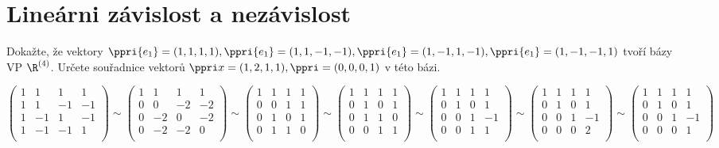 
\let\braceru=\relax \let\bracelu=\relax 
\def\o#1{\setbox0=
	\hbox{$\kern2pt\overbrace{\kern-2pt#1\kern-2pt}\kern2pt$}\ht0=2.1ex\box0}
\def\to#1{\hbox{#1\rlap{\t{}}}}
\def\rad{\rm{rad}}
\def\f{\frac}
\BeginDoc{}
\section{Lineárni závislost a nezávislost}

\Pr Dokažte, že vektory $\ppri{e_1} = (1,1,1,1),\ppri{e_1} = (1,1,-1,-1),\ppri{e_1} = (1,-1,1,-1),\ppri{e_1} = (1,-1,-1,1)$  tvoří bázy VP $\R^{(4)}$. Určete souřadnice vektorů $\ppri x = (1,2,1,1), \ppri = (0,0,0,1)$ v této bázi.


 $ \begin{pmatrix}
1 &1 &1 & 1 \\ 
1 &1 &-1 & -1 \\ 
1 &-1 &1 & -1 \\ 
1 &-1 &-1 & 1 \\ 
\end{pmatrix}
\sim
\begin{pmatrix}
1 &1 &1 & 1 \\ 
0 &0 &-2 & -2 \\ 
0 &-2 &0 & -2 \\ 
0 &-2 &-2 & 0 \\ 
\end{pmatrix}
\sim
\begin{pmatrix}
1 &1 &1 & 1 \\ 
0 &0 &1 & 1 \\ 
0 &1 &0 & 1 \\ 
0 &1 &1 & 0 \\ 
\end{pmatrix}
\sim
\begin{pmatrix}
1 &1 &1 & 1 \\ 
0 &1 &0 & 1 \\ 
0 &1 &1 & 0 \\ 
0 &0 &1 & 1 \\ 
\end{pmatrix}
\sim
\begin{pmatrix}
1 &1 &1 & 1 \\ 
0 &1 &0 & 1 \\ 
0 &0 &1 & -1 \\ 
0 &0 &1 & 1 \\ 
\end{pmatrix}
\sim
\begin{pmatrix}
1 &1 &1 & 1 \\ 
0 &1 &0 & 1 \\ 
0 &0 &1 & -1 \\ 
0 &0 &0 & 2 \\ 
\end{pmatrix}
\sim
\begin{pmatrix}
1 &1 &1 & 1 \\ 
0 &1 &0 & 1 \\ 
0 &0 &1 & -1 \\ 
0 &0 &0 & 1 \\ 
\end{pmatrix} $

